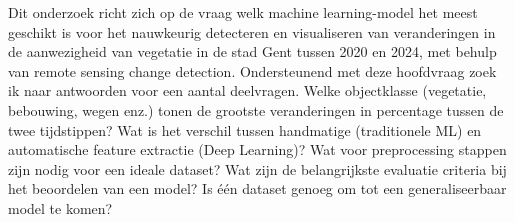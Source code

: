 
Dit onderzoek richt zich op de vraag welk machine learning-model het meest geschikt is voor het nauwkeurig detecteren en visualiseren 
van veranderingen in de aanwezigheid van vegetatie in de stad Gent tussen 2020 en 2024, met behulp van remote sensing change detection.
\newline
Ondersteunend met deze hoofdvraag zoek ik naar antwoorden voor een aantal deelvragen. Welke objectklasse (vegetatie, bebouwing, wegen enz.) 
tonen de grootste veranderingen in percentage tussen de twee tijdstippen? Wat is het verschil tussen handmatige (traditionele ML) en 
automatische feature extractie (Deep Learning)? Wat voor preprocessing stappen zijn nodig voor een ideale dataset? Wat zijn de belangrijkste 
evaluatie criteria bij het beoordelen van een model? Is één dataset genoeg om tot een generaliseerbaar model te komen?

